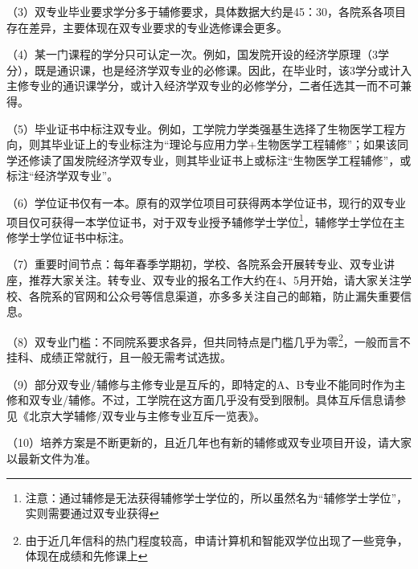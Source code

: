 \vspace{10pt}

（3）双专业毕业要求学分多于辅修要求，具体数据大约是45：30，各院系各项目存在差异，主要体现在双专业要求的专业选修课会更多。

\vspace{10pt}

（4）某一门课程的学分只可认定一次。例如，国发院开设的经济学原理（3学分），既是通识课，也是经济学双专业的必修课。因此，在毕业时，该3学分或计入主修专业的通识课学分，或计入经济学双专业的必修学分，二者任选其一而不可兼得。

\vspace{10pt}

（5）毕业证书中标注双专业。例如，工学院力学类强基生选择了生物医学工程方向，则其毕业证上的专业标注为“理论与应用力学+生物医学工程辅修”；如果该同学还修读了国发院经济学双专业，则其毕业证书上或标注“生物医学工程辅修”，或标注“经济学双专业”。

\vspace{10pt}

（6）学位证书仅有一本。原有的双学位项目可获得两本学位证书，现行的双专业项目仅可获得一本学位证书，对于双专业授予辅修学士学位\footnote{注意：通过辅修是无法获得辅修学士学位的，所以虽然名为“辅修学士学位”，实则需要通过双专业获得}，辅修学士学位在主修学士学位证书中标注。

\vspace{10pt}

（7）重要时间节点：每年春季学期初，学校、各院系会开展转专业、双专业讲座，推荐大家关注。转专业、双专业的报名工作大约在4、5月开始，请大家关注学校、各院系的官网和公众号等信息渠道，亦多多关注自己的邮箱，防止漏失重要信息。

\vspace{10pt}

（8）双专业门槛：不同院系要求各异，但共同特点是门槛几乎为零\footnote{由于近几年信科的热门程度较高，申请计算机和智能双学位出现了一些竞争，体现在成绩和先修课上}，一般而言不挂科、成绩正常就行，且一般无需考试选拔。

\vspace{10pt}

（9）部分双专业/辅修与主修专业是互斥的，即特定的A、B专业不能同时作为主修和双专业/辅修。不过，工学院在这方面几乎没有受到限制。具体互斥信息请参见《北京大学辅修/双专业与主修专业互斥一览表》。

\vspace{10pt}

（10）培养方案是不断更新的，且近几年也有新的辅修或双专业项目开设，请大家以最新文件为准。

